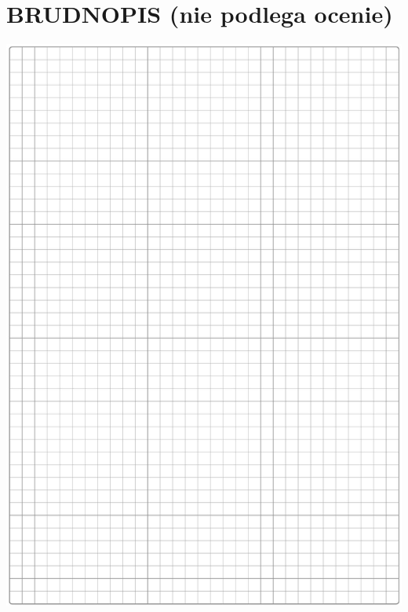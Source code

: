 \documentclass[10pt]{article}
\begin{document}
\section*{BRUDNOPIS (nie podlega ocenie)}
\begin{center}
\includegraphics[max width=\textwidth]{2024_11_21_fd9e49107d1ddcec5cd8g-13}
\end{center}
\end{document}
